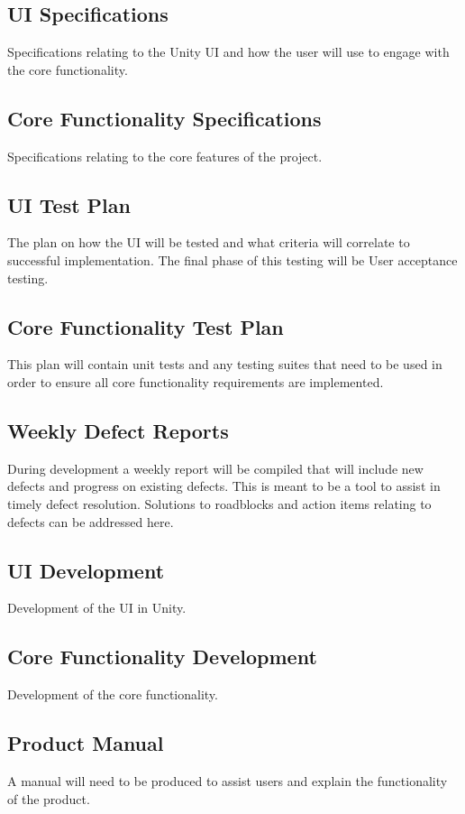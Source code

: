 \documentclass[12pt]{article}
\begin{document}
\subsection{UI Specifications} 
Specifications relating to the Unity UI and how the user will use to engage with the core functionality.  

\subsection{Core Functionality Specifications} 
Specifications relating to the core features of the project.

\subsection{UI Test Plan} 
The plan on how the UI will be tested and what criteria will correlate to successful implementation.  The final phase of this testing will be User acceptance testing.

\subsection{Core Functionality Test Plan} 
This plan will contain unit tests and any testing suites that need to be used in order to ensure all core functionality requirements are implemented.

\subsection{Weekly Defect Reports} 
During development a weekly report will be compiled that will include new defects and progress on existing defects. This is meant to be a tool to assist in timely defect resolution.  Solutions to roadblocks and action items relating to defects can be addressed here.

\subsection{UI Development} 
Development of the UI in Unity.

\subsection{Core Functionality Development} 
Development of the core functionality.

\subsection{Product Manual} 
A manual will need to be produced to assist users and explain the functionality of the product.
\end{document}
